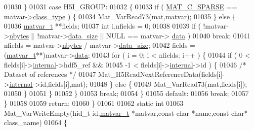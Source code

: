 \begin{DoxyCode}
01030         \}
01031         \textcolor{keywordflow}{case} H5I\_GROUP:
01032         \{
01033             \textcolor{keywordflow}{if} ( \hyperlink{group___m_a_t_ggad4d60ae7b709fc81bfd744fb4c857c40a0d5655b7e6178a2242cb3bb56ff4c8d2}{MAT\_C\_SPARSE} == matvar->\hyperlink{group___m_a_t_aff13035bf3265dd7d9425e5d40c839d4}{class\_type} ) \{
01034                 Mat\_VarRead73(mat,matvar);
01035             \} \textcolor{keywordflow}{else} \{
01036                 \hyperlink{group___m_a_t_structmatvar__t}{matvar\_t} **fields;
01037                 \textcolor{keywordtype}{int} i,nfields = 0;
01038 
01039                 \textcolor{keywordflow}{if} ( !matvar->\hyperlink{group___m_a_t_abf1c844540503be2df9bb3db93cfe307}{nbytes} || !matvar->\hyperlink{group___m_a_t_a9ad1c82e2b568da617e12dc73a26e1f9}{data\_size} || NULL == matvar->
      \hyperlink{group___m_a_t_a5672978efa230bbdecdf38ede781f7fa}{data} )
01040                     \textcolor{keywordflow}{break};
01041                 nfields = matvar->\hyperlink{group___m_a_t_abf1c844540503be2df9bb3db93cfe307}{nbytes} / matvar->\hyperlink{group___m_a_t_a9ad1c82e2b568da617e12dc73a26e1f9}{data\_size};
01042                 fields  = (\hyperlink{group___m_a_t_structmatvar__t}{matvar\_t}**)matvar->\hyperlink{group___m_a_t_a5672978efa230bbdecdf38ede781f7fa}{data};
01043                 for ( i = 0; i < nfields; i++ ) \{
01044                     \textcolor{keywordflow}{if} (  0 < fields[i]->\hyperlink{namespaceinternal}{internal}->hdf5\_ref &&
01045                          -1 < fields[i]->\hyperlink{group___m_a_t_a6e97e3ed9f40c49322c18561c2a94e92}{internal}->id ) \{
01046                         \textcolor{comment}{/* Dataset of references */}
01047                         Mat\_H5ReadNextReferenceData(fields[i]->\hyperlink{namespaceinternal}{internal}->id,fields[i],mat);
01048                     \} \textcolor{keywordflow}{else} \{
01049                         Mat\_VarRead73(mat,fields[i]);
01050                     \}
01051                 \}
01052             \}
01053             \textcolor{keywordflow}{break};
01054         \}
01055         \textcolor{keywordflow}{default}:
01056             \textcolor{keywordflow}{break};
01057     \}
01058 
01059     \textcolor{keywordflow}{return};
01060 \}
01061 
01062 \textcolor{keyword}{static} \textcolor{keywordtype}{int}
01063 Mat\_VarWriteEmpty(hid\_t \textcolor{keywordtype}{id},\hyperlink{group___m_a_t_structmatvar__t}{matvar\_t} *matvar,\textcolor{keyword}{const} \textcolor{keywordtype}{char} *name,\textcolor{keyword}{const} \textcolor{keywordtype}{char}* class\_name)
01064 \{

\end{DoxyCode}
